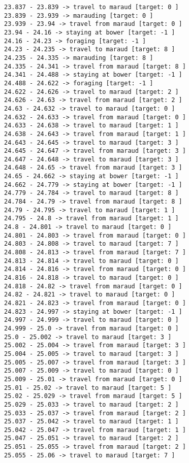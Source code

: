 \documentclass[11pt]{article}
\begin{document}
\begin{Verbatim}[commandchars=\\\{\}]
23.837 - 23.839 -> travel to maraud [target: 0 ]
23.839 - 23.939 -> marauding [target: 0 ]
23.939 - 23.94 -> travel from maraud [target: 0 ]
23.94 - 24.16 -> staying at bower [target: -1 ]
24.16 - 24.23 -> foraging [target: -1 ]
24.23 - 24.235 -> travel to maraud [target: 8 ]
24.235 - 24.335 -> marauding [target: 8 ]
24.335 - 24.341 -> travel from maraud [target: 8 ]
24.341 - 24.488 -> staying at bower [target: -1 ]
24.488 - 24.622 -> foraging [target: -1 ]
24.622 - 24.626 -> travel to maraud [target: 2 ]
24.626 - 24.63 -> travel from maraud [target: 2 ]
24.63 - 24.632 -> travel to maraud [target: 0 ]
24.632 - 24.633 -> travel from maraud [target: 0 ]
24.633 - 24.638 -> travel to maraud [target: 1 ]
24.638 - 24.643 -> travel from maraud [target: 1 ]
24.643 - 24.645 -> travel to maraud [target: 3 ]
24.645 - 24.647 -> travel from maraud [target: 3 ]
24.647 - 24.648 -> travel to maraud [target: 3 ]
24.648 - 24.65 -> travel from maraud [target: 3 ]
24.65 - 24.662 -> staying at bower [target: -1 ]
24.662 - 24.779 -> staying at bower [target: -1 ]
24.779 - 24.784 -> travel to maraud [target: 8 ]
24.784 - 24.79 -> travel from maraud [target: 8 ]
24.79 - 24.795 -> travel to maraud [target: 1 ]
24.795 - 24.8 -> travel from maraud [target: 1 ]
24.8 - 24.801 -> travel to maraud [target: 0 ]
24.801 - 24.803 -> travel from maraud [target: 0 ]
24.803 - 24.808 -> travel to maraud [target: 7 ]
24.808 - 24.813 -> travel from maraud [target: 7 ]
24.813 - 24.814 -> travel to maraud [target: 0 ]
24.814 - 24.816 -> travel from maraud [target: 0 ]
24.816 - 24.818 -> travel to maraud [target: 0 ]
24.818 - 24.82 -> travel from maraud [target: 0 ]
24.82 - 24.821 -> travel to maraud [target: 0 ]
24.821 - 24.823 -> travel from maraud [target: 0 ]
24.823 - 24.997 -> staying at bower [target: -1 ]
24.997 - 24.999 -> travel to maraud [target: 0 ]
24.999 - 25.0 -> travel from maraud [target: 0 ]
25.0 - 25.002 -> travel to maraud [target: 3 ]
25.002 - 25.004 -> travel from maraud [target: 3 ]
25.004 - 25.005 -> travel to maraud [target: 3 ]
25.005 - 25.007 -> travel from maraud [target: 3 ]
25.007 - 25.009 -> travel to maraud [target: 0 ]
25.009 - 25.01 -> travel from maraud [target: 0 ]
25.01 - 25.02 -> travel to maraud [target: 5 ]
25.02 - 25.029 -> travel from maraud [target: 5 ]
25.029 - 25.033 -> travel to maraud [target: 2 ]
25.033 - 25.037 -> travel from maraud [target: 2 ]
25.037 - 25.042 -> travel to maraud [target: 1 ]
25.042 - 25.047 -> travel from maraud [target: 1 ]
25.047 - 25.051 -> travel to maraud [target: 2 ]
25.051 - 25.055 -> travel from maraud [target: 2 ]
25.055 - 25.06 -> travel to maraud [target: 7 ]

\end{Verbatim}
\end{document}
